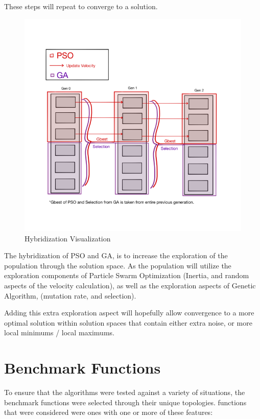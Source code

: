 \documentclass[twocolumn]{article}
\begin{document}
These steps will repeat to converge to a solution.\\
\begin{figure}[h!]
\includegraphics[scale=.35]{Images/hybridvisualization.png} 
\caption{Hybridization Visualization}
\end{figure}


The hybridization of PSO and GA, is to increase the exploration of the population through the solution space. As the population will utilize the exploration components of Particle Swarm Optimization (Inertia, and random aspects of the velocity calculation), as well as the exploration aspects of Genetic Algorithm, (mutation rate, and selection).


Adding this extra exploration aspect will hopefully allow convergence to a more optimal solution within solution spaces that contain either extra noise, or more local minimums / local maximums.

\section{Benchmark Functions}

To ensure that the algorithms were tested against a variety of situations, the benchmark functions were selected through their unique topologies. functions that were considered were ones with one or more of these features:
\end{document}
